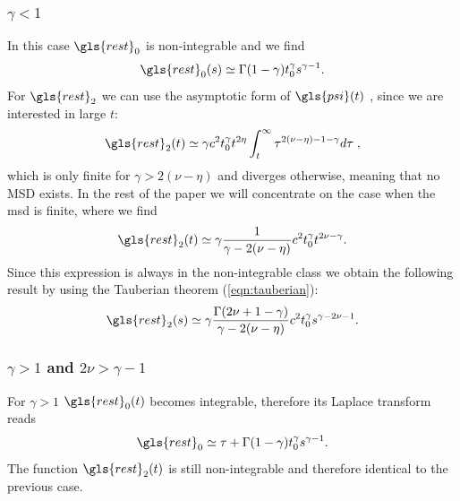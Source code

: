 \subsubsection{$\gamma<1 $ }
In this case $\gls{rest}_0$ is non-integrable and we find
\begin{equation}
  \gls{rest}_0(s) \simeq  \Gamma(1-\gamma) t_0^\gamma s^{\gamma-1}.
\end{equation}
For $\gls{rest}_2$  we can use the asymptotic form of $\gls{psi}(t)$ , since we are interested in large $t$:
\begin{equation}
\gls{rest}_2(t) \simeq \gamma c^2 t_0^\gamma t^{2\eta} \int_t^\infty \tau^{2(\nu-\eta)-1-\gamma}  d\tau   \; , 
\end{equation}
which is only finite for $\gamma > 2(\nu-\eta)$ and diverges otherwise, meaning that no MSD exists. In the rest of 
the paper we will concentrate on the case when the \gls{msd} is finite, where we find
\begin{equation}
\gls{rest}_{2}(t)  \simeq \gamma\frac{1} {\gamma - 2(\nu-\eta)} c^2 t_0^\gamma t^{2\nu -\gamma}  .
\end{equation}
Since this expression is always in the non-integrable class we obtain the following result by using the Tauberian theorem (\ref{eqn:tauberian}):
\begin{equation}
\gls{rest}_2(s) \simeq \gamma  \frac{ \Gamma(2\nu+1-\gamma)}{\gamma - 2(\nu-\eta)}c^2 t_0^\gamma s^{\gamma - 2\nu-1}.
\end{equation}

\subsubsection{$\gamma>1$ and $2\nu>\gamma-1$}
For $\gamma>1$ $\gls{rest}_0(t)$ becomes integrable, therefore its Laplace transform reads
\begin{equation}
 \gls{rest}_0 \simeq \tau + \Gamma(1-\gamma) t_0^\gamma s^{\gamma-1} .
\end{equation}
The function $\gls{rest}_2(t)$ is still non-integrable and therefore identical to the previous case.

